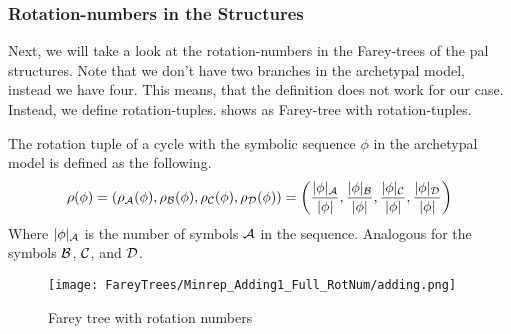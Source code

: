 \subsubsection{Rotation-numbers in the  Structures}


Next, we will take a look at the rotation-numbers in the Farey-trees of the \gls{pal} structures.
Note that we don't have two branches in the archetypal model, instead we have four.
This means, that the definition  does not work for our case.
Instead, we define rotation-tuples.
 shows as Farey-tree with rotation-tuples.

\begin{definition}
	The rotation tuple of a cycle with the symbolic sequence $\phi$ in the archetypal model is defined as the following.
	\begin{align}
		\rho(\phi)
		= \left(\rho_{\mathcal{A}}(\phi), \rho_{\mathcal{B}}(\phi), \rho_{\mathcal{C}}(\phi), \rho_{\mathcal{D}}(\phi)\right)
		= \left(\dfrac{|\phi|_{\mathcal{A}}}{|\phi|}, \dfrac{|\phi|_{\mathcal{B}}}{|\phi|}, \dfrac{|\phi|_{\mathcal{C}}}{|\phi|}, \dfrac{|\phi|_{\mathcal{D}}}{|\phi|}\right)
	\end{align}
	Where $|\phi|_{\mathcal{A}}$ is the number of symbols $\mathcal{A}$ in the sequence.
	Analogous for the symbols $\mathcal{B}$, $\mathcal{C}$, and $\mathcal{D}$.
\end{definition}

\begin{figure}
	\centering
	\texttt{[image: FareyTrees/Minrep\_Adding1\_Full\_RotNum/adding.png]}
	\caption{Farey tree with rotation numbers}
	\label{fig:add.prop.rot.num.tree}
\end{figure}


